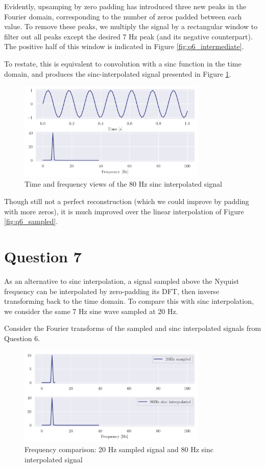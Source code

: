 \documentclass[a4paper, 11pt]{article}
\begin{document}
Evidently, upsamping by zero padding has introduced three new peaks in the
Fourier domain, corresponding to the number of zeros padded between each value.
To remove these peaks, we multiply the signal by a rectangular window to filter
out all peaks except the desired 7 Hz peak (and its negative counterpart). The
positive half of this window is indicated in Figure \ref{fig:q6_intermediate}.

To restate, this is equivalent to convolution with a sinc function in the time
domain, and produces the sinc-interpolated signal presented in Figure
\ref{fig:q6_upsampled}.

\begin{figure}[ht]
    \centering
    \includegraphics[width=0.8\textwidth]{images/q6_interpolated.png}
    \caption{Time and frequency views of the 80 Hz sinc interpolated signal}
    \label{fig:q6_upsampled}
\end{figure}

Though still not a perfect reconstruction (which we could improve by padding
with more zeros), it is much improved over the linear interpolation of Figure
\ref{fig:q6_sampled}.

\newpage
\section*{Question 7}

As an alternative to sinc interpolation, a signal sampled above the Nyquist
frequency can be interpolated by zero-padding its DFT, then inverse transforming
back to the time domain. To compare this with sinc interpolation, we consider
the same 7 Hz sine wave sampled at 20 Hz.

Consider the Fourier transforms of the sampled and sinc interpolated signals
from Question 6.

\begin{figure}[ht]
    \centering
    \includegraphics[width=0.8\textwidth]{images/q7_freqcompare.png}
    \caption{Frequency comparison: 20 Hz sampled signal and 80 Hz sinc
        interpolated signal}
    \label{fig:q7_freqcompare}
\end{figure}
\end{document}
